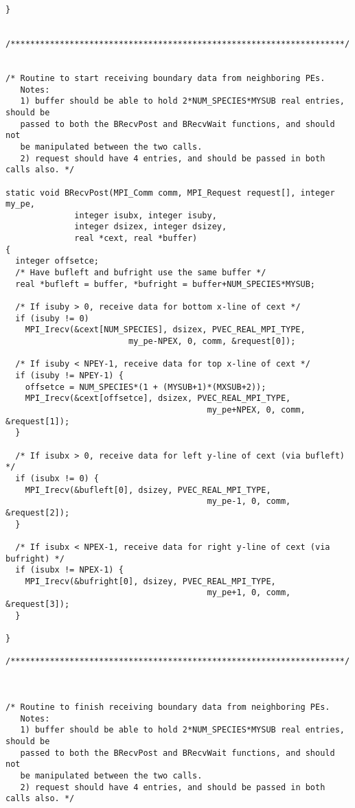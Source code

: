 \begin{verbatim}
}


/********************************************************************/

 
/* Routine to start receiving boundary data from neighboring PEs.
   Notes:
   1) buffer should be able to hold 2*NUM_SPECIES*MYSUB real entries, should be
   passed to both the BRecvPost and BRecvWait functions, and should not
   be manipulated between the two calls.
   2) request should have 4 entries, and should be passed in both calls also. */

static void BRecvPost(MPI_Comm comm, MPI_Request request[], integer my_pe,
		      integer isubx, integer isuby,
		      integer dsizex, integer dsizey,
		      real *cext, real *buffer)
{
  integer offsetce;
  /* Have bufleft and bufright use the same buffer */
  real *bufleft = buffer, *bufright = buffer+NUM_SPECIES*MYSUB;

  /* If isuby > 0, receive data for bottom x-line of cext */
  if (isuby != 0)
    MPI_Irecv(&cext[NUM_SPECIES], dsizex, PVEC_REAL_MPI_TYPE,
    					 my_pe-NPEX, 0, comm, &request[0]);

  /* If isuby < NPEY-1, receive data for top x-line of cext */
  if (isuby != NPEY-1) {
    offsetce = NUM_SPECIES*(1 + (MYSUB+1)*(MXSUB+2));
    MPI_Irecv(&cext[offsetce], dsizex, PVEC_REAL_MPI_TYPE,
                                         my_pe+NPEX, 0, comm, &request[1]);
  }

  /* If isubx > 0, receive data for left y-line of cext (via bufleft) */
  if (isubx != 0) {
    MPI_Irecv(&bufleft[0], dsizey, PVEC_REAL_MPI_TYPE,
                                         my_pe-1, 0, comm, &request[2]);
  }

  /* If isubx < NPEX-1, receive data for right y-line of cext (via bufright) */
  if (isubx != NPEX-1) {
    MPI_Irecv(&bufright[0], dsizey, PVEC_REAL_MPI_TYPE,
                                         my_pe+1, 0, comm, &request[3]);
  }

}

/********************************************************************/



/* Routine to finish receiving boundary data from neighboring PEs.
   Notes:
   1) buffer should be able to hold 2*NUM_SPECIES*MYSUB real entries, should be
   passed to both the BRecvPost and BRecvWait functions, and should not
   be manipulated between the two calls.
   2) request should have 4 entries, and should be passed in both calls also. */


\end{verbatim}
